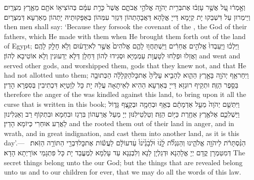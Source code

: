 {וְאָ֣מְר֔וּ עַ֚ל אֲשֶׁ֣ר עָזְב֔וּ אֶת\maqqaf בְּרִ֥ית יְהֹוָ֖ה אֱלֹהֵ֣י אֲבֹתָ֑ם אֲשֶׁר֙ כָּרַ֣ת עִמָּ֔ם בְּהוֹצִיא֥וֹ אֹתָ֖ם מֵאֶ֥רֶץ מִצְרָֽיִם׃}
{וְיֵימְרוּן עַל דִּשְׁבַקוּ יָת קְיָמָא דַּייָ אֱלָהָא דַּאֲבָהָתְהוֹן דִּגְזַר עִמְּהוֹן בְּאַפָּקוּתֵיהּ יָתְהוֹן מֵאַרְעָא דְּמִצְרָיִם׃}
{then men shall say: ‘Because they forsook the covenant of the \lord, the God of their fathers, which He made with them when He brought them forth out of the land of Egypt;}{}
{וַיֵּלְכ֗וּ וַיַּֽעַבְדוּ֙ אֱלֹהִ֣ים אֲחֵרִ֔ים וַיִּֽשְׁתַּחֲו֖וּ לָהֶ֑ם אֱלֹהִים֙ אֲשֶׁ֣ר לֹֽא\maqqaf יְדָע֔וּם וְלֹ֥א חָלַ֖ק לָהֶֽם׃}
{וַאֲזַלוּ וּפְלַחוּ לְטָעֲוָת עַמְמַיָּא וּסְגִידוּ לְהוֹן דַּחְלָן דְּלָא יְדַעוּנִין וְלָא אוֹטִיבָא לְהוֹן׃}
{and went and served other gods, and worshipped them, gods that they knew not, and that He had not allotted unto them;}{}
{וַיִּחַר\maqqaf אַ֥ף יְהֹוָ֖ה בָּאָ֣רֶץ הַהִ֑וא לְהָבִ֤יא עָלֶ֙יהָ֙ אֶת\maqqaf כׇּל\maqqaf הַקְּלָלָ֔ה הַכְּתוּבָ֖ה בַּסֵּ֥פֶר הַזֶּֽה׃}
{וּתְקֵיף רוּגְזָא דַּייָ בְּאַרְעָא הַהִיא לְאֵיתָאָה עֲלַהּ יָת כָּל לְוָטַיָּא דִּכְתִיבִין בְּסִפְרָא הָדֵין׃}
{therefore the anger of the \lord\space was kindled against this land, to bring upon it all the curse that is written in this book;}{}
{וַיִּתְּשֵׁ֤ם יְהֹוָה֙ מֵעַ֣ל אַדְמָתָ֔ם בְּאַ֥ף וּבְחֵמָ֖ה וּבְקֶ֣צֶף גָּד֑וֹל וַיַּשְׁ{\large לִ}כֵ֛ם אֶל\maqqaf אֶ֥רֶץ אַחֶ֖רֶת כַּיּ֥וֹם הַזֶּֽה׃}
{וְטַלְטֵילִנּוּן יְיָ מֵעַל אֲרַעְהוֹן בִּרְגַז וּבִחְמָא וּבִתְקוֹף רַב וְאַגְלִינוּן לַאֲרַע אוּחְרִי כְּיוֹמָא הָדֵין׃}
{and the \lord\space rooted them out of their land in anger, and in wrath, and in great indignation, and cast them into another land, as it is this day’.—}{}
{הַנִּ֨סְתָּרֹ֔ת לַיהֹוָ֖ה אֱלֹהֵ֑ינוּ וְהַנִּגְלֹ֞ת לָ֤ׄנׄוּׄ וּׄלְׄבָׄנֵ֙ׄיׄנׄוּ֙ׄ עַׄד\maqqaf עוֹלָ֔ם לַעֲשׂ֕וֹת אֶת\maqqaf כׇּל\maqqaf דִּבְרֵ֖י הַתּוֹרָ֥ה הַזֹּֽאת׃ \setuma }
{דְּמִטַּמְרָן קֳדָם יְיָ אֱלָהַנָא וּדְגַלְיָן לַנָא וְלִבְנַנָא עַד עָלְמָא לְמֶעֱבַד יָת כָּל פִּתְגָמֵי אוֹרָיְתָא הָדָא׃}
{The secret things belong unto the \lord\space our God; but the things that are revealed belong unto us and to our children for ever, that we may do all the words of this law.}{}
